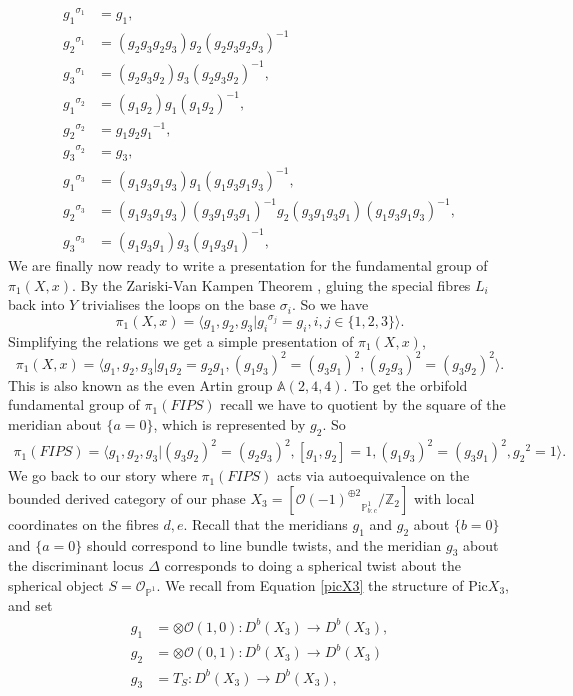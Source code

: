 \documentclass[oneside,reqno]{amsart}
\theoremstyle{definition}
\theoremstyle{definition}
\theoremstyle{definition}
\theoremstyle{definition}
\newcommand{\PP}{\mathbb{P}}
\newcommand{\A}{\mathbb{A}}
\newcommand{\Z}{\mathbb{Z}}
\newcommand{\Os}{\mathcal{O}}
\begin{document}
\begin{align*}
    {g_1}^{\sigma_1} &= g_1, \\
    {g_2}^{\sigma_1} &= (g_2 g_3 g_2 g_3) g_2 (g_2 g_3 g_2 g_3)^{-1} \\
    {g_3}^{\sigma_1} &= (g_2 g_3 g_2) g_3 (g_2 g_3 g_2)^{-1}, \\ 
    {g_1}^{\sigma_2} &= (g_1g_2) g_1 (g_1 g_2)^{-1},\\
    {g_2}^{\sigma_2} &= g_1 g_2 {g_1}^{-1},\\
    {g_3}^{\sigma_2} &= g_3, \\
    {g_1}^{\sigma_3} &= (g_1 g_3 g_1 g_3) g_1 (g_1 g_3 g_1 g_3)^{-1}, \\
    {g_2}^{\sigma_3} &= (g_1 g_3 g_1 g_3)(g_3 g_1 g_3 g_1)^{-1} g_2 (g_3 g_1 g_3 g_1)(g_1 g_3 g_1 g_3)^{-1}, \\
    {g_3}^{\sigma_3} &= (g_1 g_3 g_1)g_3 (g_1 g_3 g_1)^{-1}, 
\end{align*}
We are finally now ready to write a presentation for the fundamental group of $\pi_1(X,x)$. By the Zariski-Van Kampen Theorem \cite[Theorem 2.6 ]{cogolludo}, gluing the special fibres $L_i$ back into $Y$ trivialises the loops on the base $\sigma_i$. So we have 
$$
\pi_1(X,x) = \langle g_1, g_2, g_3 | {g_i}^{\sigma_j}=g_i, i,j \in \{1,2,3\} \rangle.
$$
Simplifying the relations we get a simple presentation of $\pi_1(X,x)$,
$$
\pi_1(X,x) = \langle g_1, g_2, g_3 | g_1g_2=g_2 g_1, (g_1 g_3)^2 = (g_3 g_1)^2 , (g_2g_3)^2= (g_3g_2)^2\rangle.
$$
This is also known as the even Artin group $\A (2,4,4)$. To get the orbifold fundamental group of $\pi_1(FIPS)$ recall we have to quotient by the square of the meridian about $\{ a=0\}$, which is represented by $g_2$. So 
\begin{align}
\pi_1(FIPS) = \langle g_1, g_2, g_3 |(g_3g_2)^2 = (g_2g_3)^2, [g_1,g_2]=1, (g_1 g_3)^2 = (g_3 g_1)^2 , {g_2}^2 =1\rangle.
\label{fipspresentation}
\end{align}
We go back to our story where $\pi_1(FIPS)$ acts via autoequivalence on the bounded derived category of our phase $X_3 = \left[{\mathcal{O}(-1)^{\oplus 2}}_{\PP^1_{b:c}} / \Z_2 \right]$ with local coordinates on the fibres $d,e$. Recall that the meridians $ g_1$ and $g_2$ about $\{b=0 \}$ and $\{a=0 \}$ should correspond to line bundle twists, and the meridian $ g_3 $ about the discriminant locus $\Delta$ corresponds to doing a spherical twist about the spherical object $S=\Os_{\PP^1}$. We recall from Equation \eqref{picX3} the structure of $\text{Pic}X_3$, and set
\begin{align*}
    g_1 &= \otimes \Os(1,0) : D^b(X_3) \to D^b(X_3),\\
    g_2 &= \otimes \Os(0,1) : D^b(X_3) \to D^b(X_3)\\
    g_3 &= T_{S}: D^b(X_3) \to D^b(X_3),
\end{align*}
\end{document}
